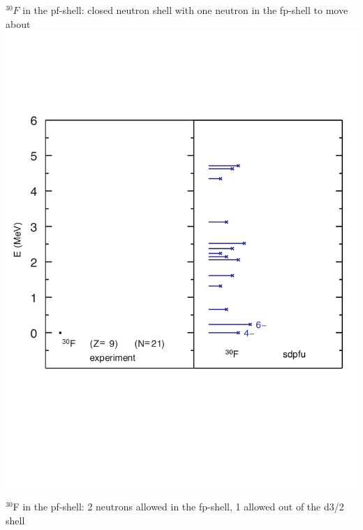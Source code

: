 \documentclass[12pt]{article}
\begin{document}
$^{30}F$ in the pf-shell: closed neutron shell with one neutron in the fp-shell to move about
\includegraphics[width=\textwidth]{f_30u-1n.pdf}

\newpage

$^{30}$F in the pf-shell: 2 neutrons allowed in the fp-shell, 1 allowed out of the d3/2 shell
\end{document}
